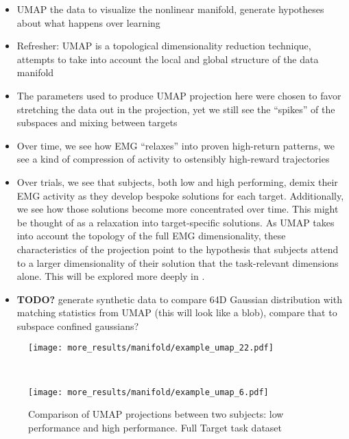 \documentclass[../main.tex]{subfiles}
\begin{document}
\begin{itemize}
  \setlength\itemsep{0em}
  \item UMAP the data to visualize the nonlinear manifold, generate hypotheses about what happens over learning
  \item Refresher: UMAP is a topological dimensionality reduction technique, attempts to take into account the local and global structure of the data manifold 
  \item The parameters used to produce UMAP projection here were chosen to favor stretching the data out in the projection, yet we still see the ``spikes'' of the subspaces and mixing between targets
  \item Over time, we see how EMG ``relaxes'' into proven high-return patterns, we see a kind of compression of activity to ostensibly high-reward trajectories
  \item Over trials, we see that subjects, both low and high performing, demix their EMG activity as they develop bespoke solutions for each target. Additionally, we see how those solutions become more concentrated over time. This might be thought of as a relaxation into target-specific solutions. As UMAP takes into account the topology of the full EMG dimensionality, these characteristics of the projection point to the hypothesis that subjects attend to a larger dimensionality of their solution that the task-relevant dimensions alone. This will be explored more deeply in .
  \item \textbf{TODO?} generate synthetic data to compare 64D Gaussian distribution with matching statistics from UMAP (this will look like a blob), compare that to subspace confined gaussians?
\end{itemize}



\begin{figure}[tph]
  \centering
  \begin{minipage}{\textwidth}
    \texttt{[image: more\_results/manifold/example\_umap\_22.pdf]}
    \subcaption{}
  \end{minipage}\\%
  \begin{minipage}{\textwidth}
    \texttt{[image: more\_results/manifold/example\_umap\_6.pdf]}
    \subcaption{}
  \end{minipage}
  \caption[Comparison of UMAP projections between two subjects]{Comparison of UMAP projections between two subjects: low performance and high performance. Full Target task dataset}\label{fig:umap_comparison}
\end{figure}
\end{document}
